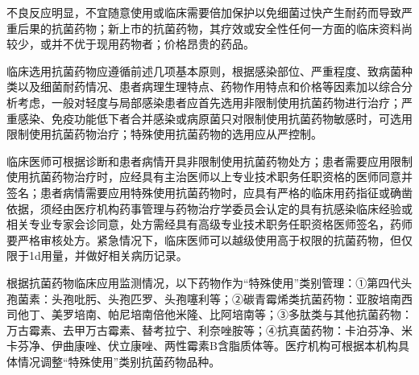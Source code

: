 不良反应明显，不宜随意使用或临床需要倍加保护以免细菌过快产生耐药而导致严重后果的抗菌药物；新上市的抗菌药物，其疗效或安全性任何一方面的临床资料尚较少，或并不优于现用药物者；价格昂贵的药品。

临床选用抗菌药物应遵循前述几项基本原则，根据感染部位、严重程度、致病菌种类以及细菌耐药情况、患者病理生理特点、药物作用特点和价格等因素加以综合分析考虑，一般对轻度与局部感染患者应首先选用非限制使用抗菌药物进行治疗；严重感染、免疫功能低下者合并感染或病原菌只对限制使用抗菌药物敏感时，可选用限制使用抗菌药物治疗；特殊使用抗菌药物的选用应从严控制。

临床医师可根据诊断和患者病情开具非限制使用抗菌药物处方；患者需要应用限制使用抗菌药物治疗时，应经具有主治医师以上专业技术职务任职资格的医师同意并签名；患者病情需要应用特殊使用抗菌药物时，应具有严格的临床用药指征或确凿依据，须经由医疗机构药事管理与药物治疗学委员会认定的具有抗感染临床经验或相关专业专家会诊同意，处方需经具有高级专业技术职务任职资格医师签名，药师要严格审核处方。紧急情况下，临床医师可以越级使用高于权限的抗菌药物，但仅限于1d用量，并做好相关病历记录。

根据抗菌药物临床应用监测情况，以下药物作为“特殊使用”类别管理：①第四代头孢菌素：头孢吡肟、头孢匹罗、头孢噻利等；②碳青霉烯类抗菌药物：亚胺培南西司他丁、美罗培南、帕尼培南倍他米隆、比阿培南等；③多肽类与其他抗菌药物：万古霉素、去甲万古霉素、替考拉宁、利奈唑胺等；④抗真菌药物：卡泊芬净、米卡芬净、伊曲康唑、伏立康唑、两性霉素B含脂质体等。医疗机构可根据本机构具体情况调整“特殊使用”类别抗菌药物品种。